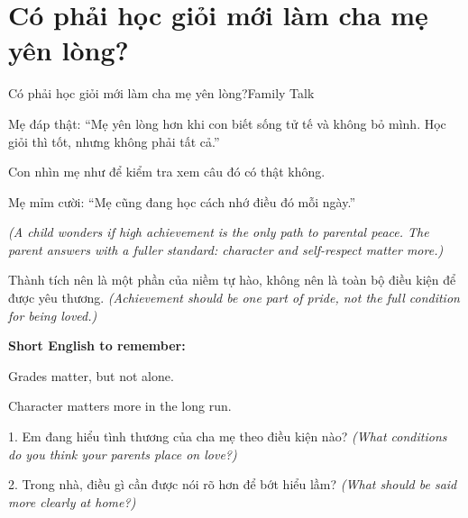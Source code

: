 \section{Có phải học giỏi mới làm cha mẹ yên lòng?}
\begin{truyen}{Có phải học giỏi mới làm cha mẹ yên lòng?}{Family Talk}

Mẹ đáp thật: ``Mẹ yên lòng hơn khi con biết sống tử tế và không bỏ mình. Học giỏi thì tốt, nhưng không phải tất cả.''

Con nhìn mẹ như để kiểm tra xem câu đó có thật không.

Mẹ mỉm cười: ``Mẹ cũng đang học cách nhớ điều đó mỗi ngày.''

\textit{(A child wonders if high achievement is the only path to parental peace. The parent answers with a fuller standard: character and self-respect matter more.)}
\end{truyen}

\begin{baihoc}
Thành tích nên là một phần của niềm tự hào, không nên là toàn bộ điều kiện để được yêu thương.
\textit{(Achievement should be one part of pride, not the full condition for being loved.)}
\end{baihoc}

\begin{ghinhoanh}
\textbf{Short English to remember:}

Grades matter, but not alone.

Character matters more in the long run.
\end{ghinhoanh}

\begin{tuhocnhanh}
1. Em đang hiểu tình thương của cha mẹ theo điều kiện nào? \textit{(What conditions do you think your parents place on love?)}

2. Trong nhà, điều gì cần được nói rõ hơn để bớt hiểu lầm? \textit{(What should be said more clearly at home?)}
\end{tuhocnhanh}
\ngancach